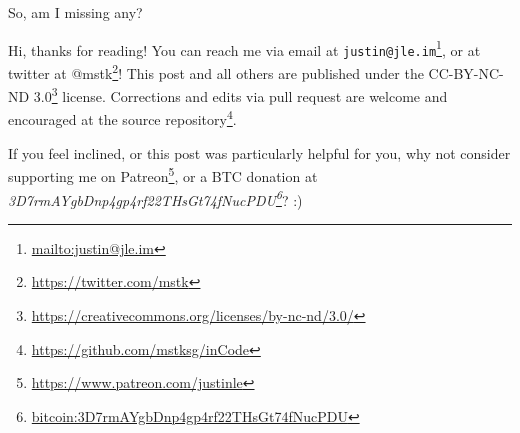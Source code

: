 \documentclass[]{article}
\renewcommand{\href}[2]{#2\footnote{\url{#1}}}
\begin{document}
So, am I missing any?

Hi, thanks for reading! You can reach me via email at
\href{mailto:justin@jle.im}{\nolinkurl{justin@jle.im}}, or at twitter at
\href{https://twitter.com/mstk}{@mstk}! This post and all others are published
under the \href{https://creativecommons.org/licenses/by-nc-nd/3.0/}{CC-BY-NC-ND
3.0} license. Corrections and edits via pull request are welcome and encouraged
at \href{https://github.com/mstksg/inCode}{the source repository}.

If you feel inclined, or this post was particularly helpful for you, why not
consider \href{https://www.patreon.com/justinle}{supporting me on Patreon}, or a
BTC donation at
\emph{\href{bitcoin:3D7rmAYgbDnp4gp4rf22THsGt74fNucPDU}{3D7rmAYgbDnp4gp4rf22THsGt74fNucPDU}}?
:)
\end{document}
